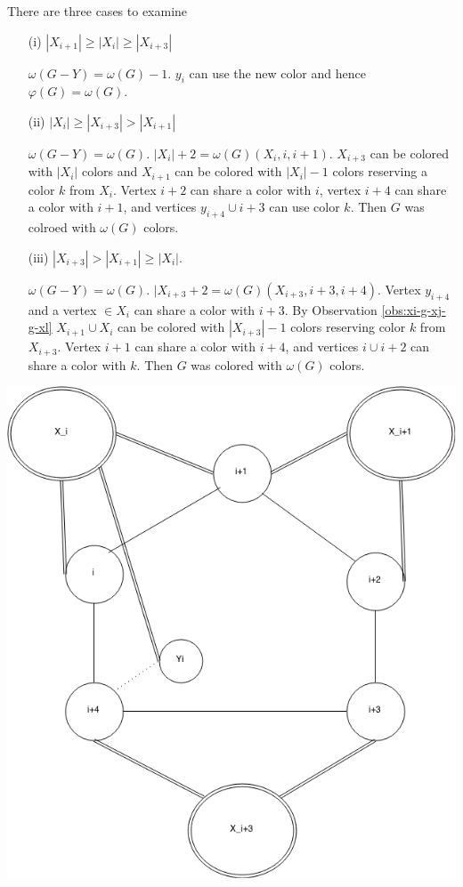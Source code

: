 \documentclass[12pt]{article}
\begin{document}
\begin{minipage}{0.5\textwidth}%
	 There are three cases to examine
	\begin{itemize}
		\item[(i)]
			$|X_{i+1}| \geq |X_i| \geq |X_{i+3}|$

			$\omega(G - Y) = \omega(G) - 1$. $y_{i}$ can use the new color and hence $\varphi(G) = \omega(G)$. 
		\item[(ii)]
			$|X_{i}| \geq |X_{i+3}| > |X_{i+1}|$
		
			$\omega(G - Y) = \omega(G)$. $|X_i| + 2 = \omega(G) (X_i, i, i+1)$. $X_{i+3}$ can be colored with $|X_i|$ colors and $X_{i+1}$ can be colored with $|X_i| - 1$ colors reserving a color $k$ from $X_i$. Vertex $i+2$ can share a color with $i$, vertex $i+4$ can share a color with $i+1$, and vertices $y_{i+4} \cup i+3$ can use color $k$.  Then $G$ was colroed with $\omega(G)$ colors.
		\item[(iii)]
			$|X_{i+3}| > |X_{i+1}| \geq |X_{i}|$.

			$\omega(G - Y) = \omega(G)$. $|X_{i+3} + 2 =\omega(G) (X_{i+3}, i+3, i+4)$. Vertex $y_{i+4}$ and a vertex $\in X_i$ can share a color with $i+3$. By Observation \ref{obs:xi-g-xj-g-xl} $X_{i+1} \cup X_{i}$ can be colored with $|X_{i+3}| - 1$ colors reserving color $k$ from $X_{i+3}$. Vertex $i+1$ can share a color with $i+4$, and vertices $i \cup i+2$ can share a color with $k$. Then $G$ was colored with $\omega(G)$ colors. 
	\end{itemize}
\end{minipage}
\hfill
\begin{minipage}{0.5\textwidth}\raggedleft
	\includegraphics[width=\linewidth]{Yi.png}
\end{minipage}
\end{document}
